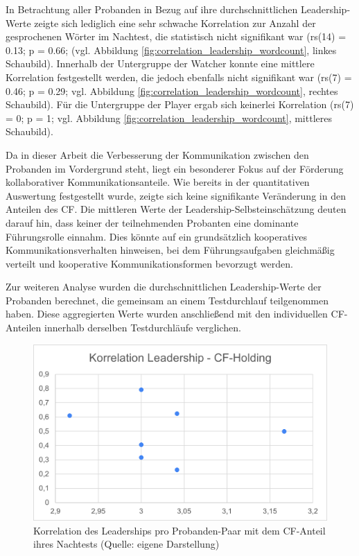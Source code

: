 In Betrachtung aller Probanden in Bezug auf ihre durchschnittlichen Leadership-Werte zeigte sich lediglich eine sehr schwache Korrelation zur Anzahl der gesprochenen Wörter im Nachtest, die statistisch nicht signifikant war (rs(14) = 0.13; p = 0.66; (vgl. Abbildung \ref{fig:correlation_leadership_wordcount}, linkes Schaubild). Innerhalb der Untergruppe der Watcher konnte eine mittlere Korrelation festgestellt werden, die jedoch ebenfalls nicht signifikant war  (rs(7) = 0.46; p = 0.29; vgl. Abbildung \ref{fig:correlation_leadership_wordcount}, rechtes Schaubild). Für die Untergruppe der Player ergab sich keinerlei Korrelation (rs(7) = 0; p = 1; vgl. Abbildung \ref{fig:correlation_leadership_wordcount}, mittleres Schaubild).

Da in dieser Arbeit die Verbesserung der Kommunikation zwischen den Probanden im Vordergrund steht, liegt ein besonderer Fokus auf der Förderung kollaborativer Kommunikationsanteile. Wie bereits in der quantitativen Auswertung festgestellt wurde, zeigte sich keine signifikante Veränderung in den Anteilen des \ac{CF}. Die mittleren Werte der Leadership-Selbsteinschätzung deuten darauf hin, dass keiner der teilnehmenden Probanten eine dominante Führungsrolle einnahm. Dies könnte auf ein grundsätzlich kooperatives Kommunikationsverhalten hinweisen, bei dem Führungsaufgaben gleichmäßig verteilt und kooperative Kommunikationsformen bevorzugt werden.

Zur weiteren Analyse wurden die durchschnittlichen Leadership-Werte der Probanden berechnet, die gemeinsam an einem Testdurchlauf teilgenommen haben. Diese aggregierten Werte wurden anschließend mit den individuellen \ac{CF}-Anteilen innerhalb derselben Testdurchläufe verglichen.

\begin{figure}[ht]
\centering
\includegraphics[width=1\linewidth]{content/pictures/korrelation_leadership_cfh.png}
\caption{Korrelation des Leaderships pro Probanden-Paar mit dem \ac{CF}-Anteil ihres Nachtests (Quelle: eigene Darstellung)}
\label{fig:correlation_leadership_cfh}
\end{figure}

